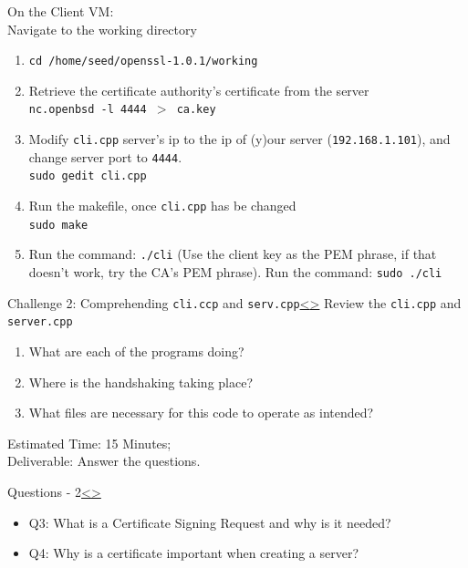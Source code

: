\documentclass[12pt]{extarticle}
\newenvironment{instructionblock}{\Large\bgroup}{\egroup}
\newcommand{\ben}{\begin{enumerate}}
\newcommand{\een}{\end{enumerate}}
\newcommand{\bi}{\begin{itemize}}
\newcommand{\ei}{\end{itemize}}
\begin{document}
\noindent
On the Client VM:\\
Navigate to the working directory
\ben
	\item \texttt{cd /home/seed/openssl-1.0.1/working}
	\item Retrieve the certificate authority's certificate from the server\\
	\texttt{nc.openbsd -l 4444 $>$ ca.key} 
	\item Modify \texttt{cli.cpp} server's ip to the ip of (y)our server (\texttt{192.168.1.101}), and change server port to \texttt{4444}.\\
	\texttt{sudo gedit cli.cpp}
	\item Run the makefile, once \texttt{cli.cpp} has be changed \\
	\texttt{sudo make}
	\item Run the command: \texttt{./cli} (Use the client key as the PEM phrase, if that doesn't work, try the CA's PEM phrase). Run the command: \texttt{sudo ./cli}
\een



\pagebreak
\begin{slide}{Challenge 2: Comprehending \texttt{cli.ccp} and \texttt{serv.cpp}}{\hyperref[slide 12]{\textless}\hyperref[slide 14]{\textgreater}}
\vskip 5pt
\begin{instructionblock}
Review the \texttt{cli.cpp} and \texttt{server.cpp}
	\ben
		\item What are each of the programs doing?
		\item Where is the handshaking taking place?
		\item What files are necessary for this code to operate as intended?
	\een 
\end{instructionblock}
\end{slide}
\noindent
Estimated Time: 15 Minutes; \\
Deliverable: Answer the questions.



\pagebreak
\begin{slide}{Questions - 2}{\hyperref[slide 13]{\textless}\hyperref[slide 15]{\textgreater}}
\begin{instructionblock}
\bi 
	\item [Q3:] What is a Certificate Signing Request and why is it needed?
	\item [Q4:] Why is a certificate important when creating a server?
\ei

\end{instructionblock}
\end{slide}
\vfill
\end{document}
